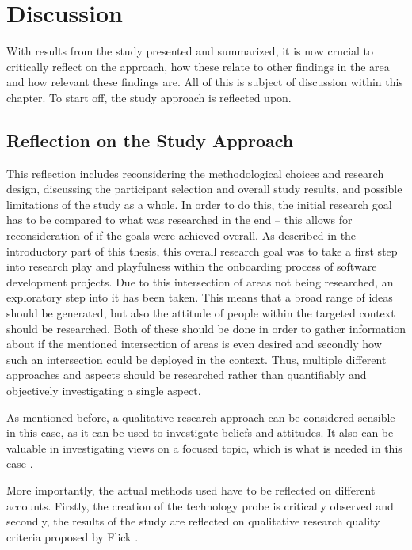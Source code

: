 \section{Discussion}

With results from the study presented and summarized, it is now crucial to critically reflect on the approach, how these relate to other findings in the area and how relevant these findings are. All of this is subject of discussion within this chapter. To start off, the study approach is reflected upon.

\subsection{Reflection on the Study Approach}

This reflection includes reconsidering the methodological choices and research design, discussing the participant selection and overall study results, and possible limitations of the study as a whole. In order to do this, the initial research goal has to be compared to what was researched in the end -- this allows for reconsideration of if the goals were achieved overall. As described in the introductory part of this thesis, this overall research goal was to take a first step into research play and playfulness within the onboarding process of software development projects. Due to this intersection of areas not being researched, an exploratory step into it has been taken. This means that a broad range of ideas should be generated, but also the attitude of people within the targeted context should be researched. Both of these should be done in order to gather information about if the mentioned intersection of areas is even desired and secondly how such an intersection could be deployed in the context. Thus, multiple different approaches and aspects should be researched rather than quantifiably and objectively investigating a single aspect.

As mentioned before, a qualitative research approach can be considered sensible in this case, as it can be used to investigate beliefs and attitudes. It also can be valuable in investigating views on a focused topic, which is what is needed in this case \cite{10.1093/humrep/dev334}.

More importantly, the actual methods used have to be reflected on different accounts. Firstly, the creation of the technology probe is critically observed and secondly, the results of the study are reflected on qualitative research quality criteria proposed by Flick \cite[p. 541-549]{flick2018introduction}.

